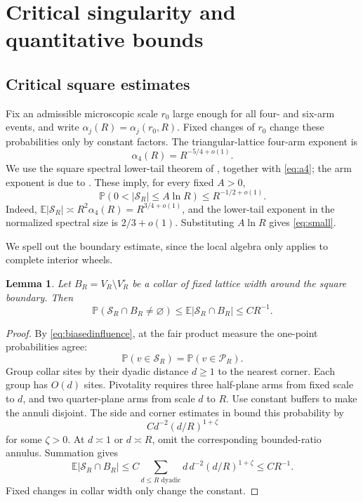 \documentclass[11pt]{amsart}
\newtheorem{lemma}[theorem]{Lemma}
\theoremstyle{remark}
\newcommand{\Prob}{\mathbb P}
\newcommand{\E}{\mathbb E}
\newcommand{\cS}{\mathcal S}
\newcommand{\cP}{\mathcal P}
\begin{document}
\section{Critical singularity and quantitative bounds}\label{sec:criticalrates}
\subsection{Critical square estimates}\label{sec:critical}

Fix an admissible microscopic scale $r_0$ large enough for all four- and six-arm events, and write $\alpha_j(R)=\alpha_j(r_0,R)$. Fixed changes of $r_0$ change these probabilities only by constant factors. The triangular-lattice four-arm exponent is
\begin{equation}\label{eq:a4}
 \alpha_4(R)=R^{-5/4+o(1)}.
\end{equation}
We use the square spectral lower-tail theorem of \cite[Theorem~1.1 and equation~(1.7)]{GPS}, together with \eqref{eq:a4}; the arm exponent is due to \cite{SW}. These imply, for every fixed $A>0$,
\begin{equation}\label{eq:small}
 \Prob(0<|\cS_R|\le A\ln R)\le R^{-1/2+o(1)}.
\end{equation}
Indeed, $\E|\cS_R|\asymp R^2\alpha_4(R)=R^{3/4+o(1)}$, and the lower-tail exponent in the normalized spectral size is $2/3+o(1)$. Substituting $A\ln R$ gives \eqref{eq:small}.

We spell out the boundary estimate, since the local algebra only applies to complete interior wheels.

\begin{lemma}\label{lem:boundary}
Let $B_R=V_R\setminus V_R^\circ$ be a collar of fixed lattice width around the square boundary. Then
\[
 \Prob(\cS_R\cap B_R\ne\varnothing)
 \le\E|\cS_R\cap B_R|\le C R^{-1}.
\]
\end{lemma}
\begin{proof}
By \eqref{eq:biasedinfluence}, at the fair product measure the one-point probabilities agree:
\[
 \Prob(v\in\cS_R)=\Prob(v\in\cP_R).
\]
Group collar sites by their dyadic distance $d\ge1$ to the nearest corner. Each group has $O(d)$ sites. Pivotality requires three half-plane arms from fixed scale to $d$, and two quarter-plane arms from scale $d$ to $R$. Use constant buffers to make the annuli disjoint. The side and corner estimates in \cite[equations~(4.12)--(4.13) and Section~7.2]{GPS} bound this probability by
\[
 C d^{-2}(d/R)^{1+\zeta}
\]
for some $\zeta>0$. At $d\asymp1$ or $d\asymp R$, omit the corresponding bounded-ratio annulus. Summation gives
\[
 \E|\cS_R\cap B_R|
 \le C\sum_{d\le R\text{ dyadic}}d\,d^{-2}(d/R)^{1+\zeta}
 \le C R^{-1}.
\]
Fixed changes in collar width only change the constant.
\end{proof}
\end{document}
